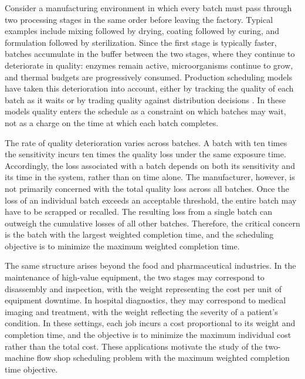 ﻿\documentclass[12pt]{article} \textheight=24.5cm \textwidth=16.5cm \parskip = 0.165cm
\begin{document}
\begin{sloppypar}
        Consider a manufacturing environment in which every batch must pass through two processing stages in the same order before leaving the factory.
        Typical examples include mixing followed by drying, coating followed by curing, and formulation followed by sterilization.
        Since the first stage is typically faster, batches accumulate in the buffer between the two stages, where they continue to deteriorate in quality: enzymes remain active, microorganisms continue to grow, and thermal budgets are progressively consumed.
        Production scheduling models have taken this deterioration into account, either by tracking the quality of each batch as it waits \citep{SteinbacherRippelSchulze2023JMS} or by trading quality against distribution decisions \citep{JafariNozarBehnamian2021EO}.
        In these models quality enters the schedule as a constraint on which batches may wait, not as a charge on the time at which each batch completes.

        The rate of quality deterioration varies across batches.
        A batch with ten times the sensitivity incurs ten times the quality loss under the same exposure time.
        Accordingly, the loss associated with a batch depends on both its sensitivity and its time in the system, rather than on time alone.
        The manufacturer, however, is not primarily concerned with the total quality loss across all batches.
        Once the loss of an individual batch exceeds an acceptable threshold, the entire batch may have to be scrapped or recalled.
        The resulting loss from a single batch can outweigh the cumulative losses of all other batches.
        Therefore, the critical concern is the batch with the largest weighted completion time, and the scheduling objective is to minimize the maximum weighted completion time.

        The same structure arises beyond the food and pharmaceutical industries.
        In the maintenance of high-value equipment, the two stages may correspond to disassembly and inspection, with the weight representing the cost per unit of equipment downtime.
        In hospital diagnostics, they may correspond to medical imaging and treatment, with the weight reflecting the severity of a patient's condition.
        In these settings, each job incurs a cost proportional to its weight and completion time, and the objective is to minimize the maximum individual cost rather than the total cost.
        These applications motivate the study of the two-machine flow shop scheduling problem with the maximum weighted completion time objective.


\end{sloppypar}
\end{document}
